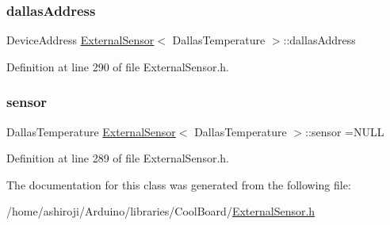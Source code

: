 \subsubsection{\texorpdfstring{dallas\+Address}{dallasAddress}}
{\footnotesize\ttfamily Device\+Address \hyperlink{classExternalSensor}{External\+Sensor}$<$ Dallas\+Temperature $>$\+::dallas\+Address\hspace{0.3cm}{\ttfamily [private]}}



Definition at line 290 of file External\+Sensor.\+h.

\mbox{\label{classExternalSensor_3_01DallasTemperature_01_4_adb6ba4fcdedef95ad8f6b0c9b6c0f9d1}} 
\subsubsection{\texorpdfstring{sensor}{sensor}}
{\footnotesize\ttfamily Dallas\+Temperature \hyperlink{classExternalSensor}{External\+Sensor}$<$ Dallas\+Temperature $>$\+::sensor =N\+U\+LL\hspace{0.3cm}{\ttfamily [private]}}



Definition at line 289 of file External\+Sensor.\+h.



The documentation for this class was generated from the following file\+:\begin{DoxyCompactItemize}
\item 
/home/ashiroji/\+Arduino/libraries/\+Cool\+Board/\hyperlink{ExternalSensor_8h}{External\+Sensor.\+h}\end{DoxyCompactItemize}
